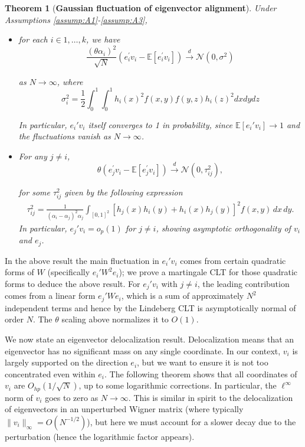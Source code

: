 \documentclass[11pt, reqno]{amsart}
\numberwithin{equation}{section}
\newtheorem{theorem}{Theorem}[section]
\newcommand{\E}{\mbox{${\mathbb E}$}}
\begin{document}
\begin{theorem}[{\bf Gaussian fluctuation of eigenvector alignment}]\label{Th.EigenVectorAlignment.CLT} Under Assumptions \ref{assump:A1}-\ref{assump:A3}, 
\begin{itemize}
    \item[(a)] for each $i\in{1,\ldots,k}$, we have
\[
\frac{\left(\theta \alpha_i\right)^2}{\sqrt{N}}\left(e_i^{\prime} v_i-\mathbb{E}\left[e_i^{\prime} v_i\right]\right) \xrightarrow{d} \mathcal{N}\left(0, \sigma^2\right)
\]

as $N\to\infty$, where
\[
\sigma_i^2=\frac{1}{2} \int_0^1 \int_0^1 h_i(x)^2 f(x, y) f(y, z) h_i(z)^2 d x d y d z
\]

\noindent
In particular, $e_i' v_i$ itself converges to 1 in probability, since $\E[e_i' v_i]\to 1$ and the fluctuations vanish as $N\to\infty$.  

\item[(b)] For any $j \ne i$,
\[
\theta \left(e_j^{\prime} v_i-\E[e_j^{\prime} v_i]\right) \xrightarrow{d} \mathcal{N}\left(0, \tau_{i j}^2\right), \]

for some $\tau_{ij}^2$ given by the following expression 
\begin{align*}
\tau_{ij}^2 = \frac{1}{(\alpha_i-\alpha_j)^2 \alpha_j}\int_{[0,1]^2} \left[h_j(x) h_i(y) + h_i(x) h_j(y)\right]^2 f(x,y)\, dx\, dy.
\end{align*}
 In particular, $e_j' v_i = o_p(1)$ for $j\ne i$, showing asymptotic orthogonality of $v_i$ and $e_j$.
\end{itemize}
\end{theorem}

In the above result the main fluctuation in $e_i'v_i$ comes from certain quadratic forms of $W$ (specifically $e_i' W^2 e_i$); we prove a martingale CLT for those quadratic forms to deduce the above result. For $e_j'v_i$ with $j\ne i$, the leading contribution comes from a linear form $e_j' W e_i$, which is a sum of approximately $N^2$ independent terms and hence by the Lindeberg CLT is asymptotically normal of order $N$. The $\theta$ scaling above normalizes it to $O(1)$.



We now state an eigenvector delocalization result. Delocalization means that an eigenvector has no significant mass on any single coordinate. In our context, $v_i$ is largely supported on the direction $e_i$, but we want to ensure it is not too concentrated even within $e_i$. The following theorem shows that all coordinates of $v_i$ are $O_{hp}(1/\sqrt{N})$, up to some logarithmic corrections. In particular, the $\ell^\infty$ norm of $v_i$ goes to zero as $N\to\infty$. This is similar in spirit to the delocalization of eigenvectors in an unperturbed Wigner matrix (where typically $\|v_i\|_\infty = O(N^{-1/2})$), but here we must account for a slower decay due to the perturbation (hence the logarithmic factor appears).
\end{document}
